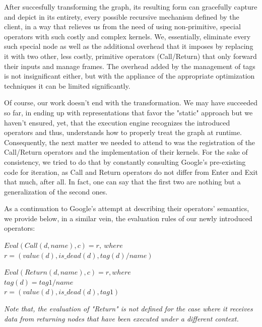 \documentclass[ack,preface]{dithesis}
\begin{document}
After succesfully transforming the graph, its resulting form can gracefully capture and depict in its entirety, every possible recursive mechanism defined by the client, in a way that relieves us from the need of using non-primitive, special operators with such costly and complex kernels. We, essentially,  eliminate every such special node as well as the additional overhead that it imposes by replacing it with two other, less costly, primitive operators (Call/Return) that only forward their inputs and manage frames.  The overhead added by the management of tags is not insignificant either, but with the appliance of the appropriate optimization techniques it can be limited significantly.

Of course, our work doesn't end with the transformation. We may have succeeded so far, in ending up with representations that favor the "static" approach but we haven't ensured, yet, that the  execution engine recognizes the introduced operators and thus, understands how to properly treat the graph at runtime. Consequently, the next matter we needed to attend to was the registration of the Call/Return operators and the implementation of their kernels.  For the sake of consistency, we tried to do that by constantly consulting Google's pre-existing code for iteration, as Call and Return operators do not differ from Enter and Exit that much, after all. In fact, one can say that the first two are nothing but a generalization of the second ones. 


As a continuation to Google's attempt at describing their operators' semantics, we provide below, in a similar vein, the evaluation rules of our newly introduced operators:

\begin{flushleft}
$Eval(Call(d, name), c) = r,\  where$ \\
\setlength{\parindent}{5ex} $r = (value(d), is\_dead(d), tag(d)/name)$
\end{flushleft}

\begin{flushleft}
$Eval(Return(d, name), c) = r, where \ $ \\
\setlength{\parindent}{5ex} $tag(d) = tag1/name$\\
$ r = (value(d), is\_dead(d), tag1)$
\end{flushleft}

\textit{Note that, the evaluation of "Return" is not defined for the case where it receives data from returning nodes that have been executed under a different context.}\\
\end{document}
